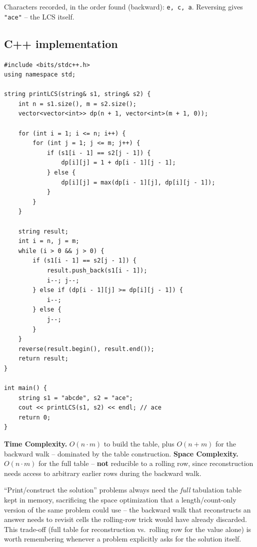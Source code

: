 Characters recorded, in the order found (backward): \texttt{e, c, a}.
Reversing gives \texttt{"ace"} -- the LCS itself.

\subsection*{C++ implementation}

\begin{lstlisting}
#include <bits/stdc++.h>
using namespace std;

string printLCS(string& s1, string& s2) {
    int n = s1.size(), m = s2.size();
    vector<vector<int>> dp(n + 1, vector<int>(m + 1, 0));

    for (int i = 1; i <= n; i++) {
        for (int j = 1; j <= m; j++) {
            if (s1[i - 1] == s2[j - 1]) {
                dp[i][j] = 1 + dp[i - 1][j - 1];
            } else {
                dp[i][j] = max(dp[i - 1][j], dp[i][j - 1]);
            }
        }
    }

    string result;
    int i = n, j = m;
    while (i > 0 && j > 0) {
        if (s1[i - 1] == s2[j - 1]) {
            result.push_back(s1[i - 1]);
            i--; j--;
        } else if (dp[i - 1][j] >= dp[i][j - 1]) {
            i--;
        } else {
            j--;
        }
    }
    reverse(result.begin(), result.end());
    return result;
}

int main() {
    string s1 = "abcde", s2 = "ace";
    cout << printLCS(s1, s2) << endl; // ace
    return 0;
}
\end{lstlisting}

\begin{complexitybox}
\textbf{Time Complexity.} $O(n \cdot m)$ to build the table, plus
$O(n+m)$ for the backward walk -- dominated by the table construction.
\textbf{Space Complexity.} $O(n \cdot m)$ for the full table --
\textbf{not} reducible to a rolling row, since reconstruction needs
access to arbitrary earlier rows during the backward walk.
\end{complexitybox}

\begin{takeawaybox}
``Print/construct the solution'' problems always need the \emph{full}
tabulation table kept in memory, sacrificing the space optimization that
a length/count-only version of the same problem could use -- the
backward walk that reconstructs an answer needs to revisit cells the
rolling-row trick would have already discarded. This trade-off (full
table for reconstruction vs.\ rolling row for the value alone) is worth
remembering whenever a problem explicitly asks for the solution itself.
\end{takeawaybox}
